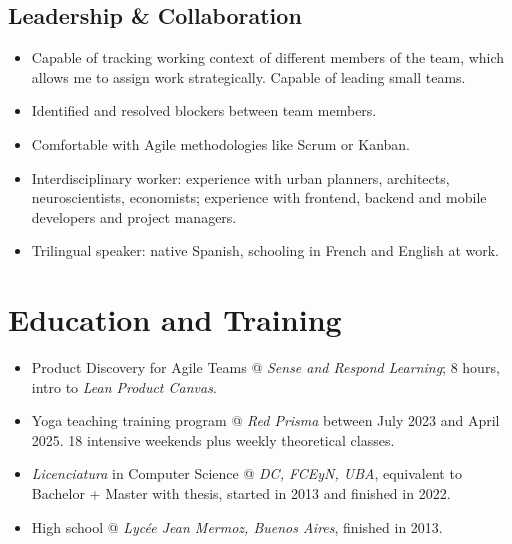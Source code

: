 \documentclass[a4paper]{article}
\begin{document}
\subsection*{Leadership \& Collaboration}
\begin{itemize}
  \item Capable of tracking working context of different members of the team, which
  allows me to assign work strategically. Capable of leading small teams.
  \item Identified and resolved blockers between team members.
  \item Comfortable with Agile methodologies like Scrum or Kanban.
  \item Interdisciplinary worker: experience with urban planners, architects,
    neuroscientists, economists; experience with frontend, backend and mobile
    developers and project managers.
  \item Trilingual speaker: native Spanish, schooling in French and English at work.
\end{itemize}

\section*{Education and Training}

\begin{itemize}
  \item Product Discovery for Agile Teams @ \textit{Sense and Respond Learning}; 8 hours, intro to \textit{Lean Product Canvas}.
  \item Yoga teaching training program @ \textit{Red Prisma} between July 2023 and April 2025. 18 intensive weekends plus weekly theoretical classes.
  \item \textit{Licenciatura} in Computer Science @ \textit{DC, FCEyN, UBA}, equivalent to Bachelor + Master with thesis, started in 2013 and finished in 2022.
  \item High school @ \textit{Lycée Jean Mermoz, Buenos Aires}, finished in 2013.
\end{itemize}
\end{document}
